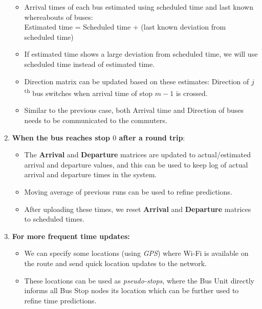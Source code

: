 \begin{enumerate}
          \begin{itemize}
              \item Arrival times of each bus estimated using scheduled time and last known whereabouts of buses:\\
                    Estimated time = Scheduled time + (last known deviation from scheduled
                    time)
              \item If estimated time shows a large deviation from scheduled time, we will use scheduled time instead of estimated time.
              \item Direction matrix can be updated based on these estimates: Direction of $j$\textsuperscript{th} bus switches when arrival time of stop $m-1$ is crossed.
              \item Similar to the previous case, both Arrival time and Direction of buses needs to be communicated to the commuters.
          \end{itemize}
    \item \textbf{When the bus reaches stop $0$ after a \gls{round trip}}:
          \begin{itemize}
              \item  The \textbf{Arrival} and \textbf{Departure} matrices are updated to actual/estimated arrival and departure values, and this can be used to keep log of actual arrival and departure times in the system.
              \item Moving average of previous runs can be used to refine predictions.
              \item  After uploading these times, we reset \textbf{Arrival} and \textbf{Departure} matrices to scheduled times.
          \end{itemize}
    \item \textbf{For more frequent time updates:}
          \begin{itemize}
              \item We can specify some locations (using \textit{\gls{GPS}}) where \gls{Wi-Fi} is available on the route and send quick location updates to the network. {\tiny \textcolor{white}{\ac{Wi-Fi}}}
              \item These locations can be used as \textit{pseudo-stops}, where the Bus Unit directly informs all Bus Stop nodes its location which can be further used to refine time predictions.
          \end{itemize}
\end{enumerate}